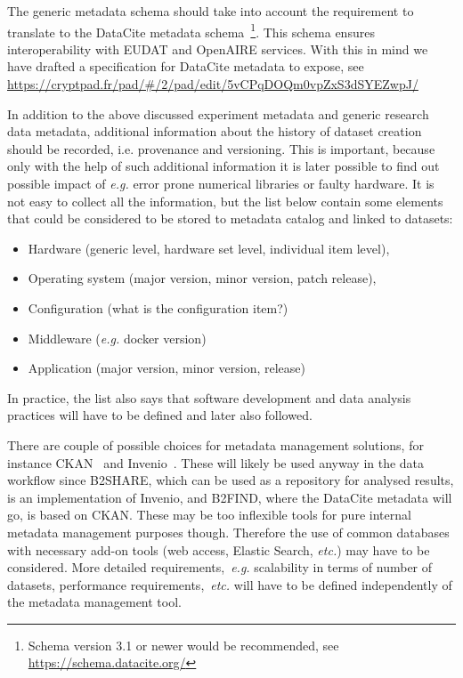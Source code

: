 \documentclass[12pt,a4paper]{article}
\begin{document}
The generic \ED metadata schema should take into account the requirement to translate to the DataCite metadata schema~\footnote{Schema version 3.1 or newer would be recommended, see \url{https://schema.datacite.org/}}. 
This schema ensures interoperability with EUDAT and OpenAIRE services.
With this in mind we have drafted a specification for DataCite metadata to expose, see \url{https://cryptpad.fr/pad/#/2/pad/edit/5vCPqDOQm0vpZxS3dSYEZwpJ/}

In addition to the above discussed experiment metadata and generic research data metadata, additional information about the history of dataset creation should be recorded, i.e. provenance and versioning.
This is important, because only with the help of such additional information it is later possible to find out possible impact of 
\emph{e.g.} error prone numerical libraries
or faulty hardware. 
It is not easy to collect all the information, but the list below contain some elements that could be considered to be stored to metadata catalog and linked to datasets:
\begin{itemize}
    \item Hardware (generic level, hardware set level, individual item level),
    \item Operating system (major version, minor version, patch release), 
    \item Configuration (what is the configuration item?)
    \item Middleware (\emph{e.g.} docker version)
    \item Application (major version, minor version, release)
\end{itemize}
In practice, the list also says that \ED{} software development and data analysis  practices will have to be defined and later also followed.

There are couple of possible choices for metadata management solutions, for instance CKAN~\cite{ckan} and Invenio~\cite{invenio}. 
These will likely be used anyway in the \ED data workflow since B2SHARE, which can be used as a repository for analysed results, is an implementation of Invenio, and B2FIND, where the DataCite metadata will go, is based on CKAN. 
These may be too inflexible tools for pure internal metadata management purposes though. 
Therefore the use of common databases with necessary add-on tools (web access, Elastic Search, \emph{etc.}) may have to be considered. 
More detailed requirements,~\emph{e.g.} scalability in terms of number of datasets, performance requirements,~\emph{etc.} will have to be defined independently of the metadata management tool.
\end{document}
